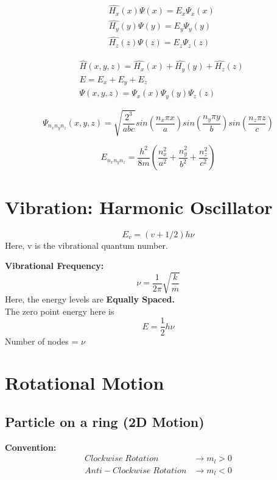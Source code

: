 \documentclass[12pt]{extarticle}
\begin{document}
\begin{align*}
	&\hat{H_x}(x) \Psi(x) = E_x \Psi_x(x) \\
	&\hat{H_y}(y) \Psi(y) = E_y \Psi_y(y) \\
	&\hat{H_z}(z) \Psi(z) = E_z \Psi_z(z) 
\end{align*}

\begin{align*}
	&\hat{H}(x, y, z) = \hat{H_x}(x) + \hat{H_y}(y) + \hat{H_z}(z) \\
	&E = E_x + E_y + E_z\\
	&\Psi(x, y, z) = \Psi_x(x)\Psi_y(y)\Psi_z(z)
\end{align*}

\begin{equation}
	\Psi_{n_xn_yn_z}(x, y, z) = \sqrt{ \frac{2^3}{abc} } sin \left( \frac{n_x\pi x}{a}  \right) sin \left( \frac{n_y\pi y}{b} \right) sin \left( \frac{n_z\pi z}{c} \right)
\end{equation}

\begin{equation}
	E_{n_xn_yn_z} = \frac{h^2}{8m} \left( \frac{n_x^2}{a^2} + \frac{n_y^2}{b^2} + \frac{n_z^2}{c^2} \right) 
\end{equation}

\section{Vibration: Harmonic Oscillator}
\begin{equation}
	E_v = (v + 1/2) h\nu
\end{equation}
Here, v is the vibrational quantum number.

\textbf{Vibrational Frequency:} 
\begin{equation}
	\nu = \frac{1}{2\pi} \sqrt{\frac{k}{m}}
\end{equation}
Here, the energy levels are \textbf{Equally Spaced.} \\
The zero point energy here is
\[
	E = \frac{1}{2} h\nu
\]
Number of nodes = $\nu$

\section{Rotational Motion}
\subsection{Particle on a ring (2D Motion)}

\textbf{Convention:} 
\begin{align*}
	Clockwise\;Rotation &\rightarrow m_l > 0 \\
	Anti-Clockwise\;Rotation &\rightarrow m_l < 0
\end{align*}
\end{document}
